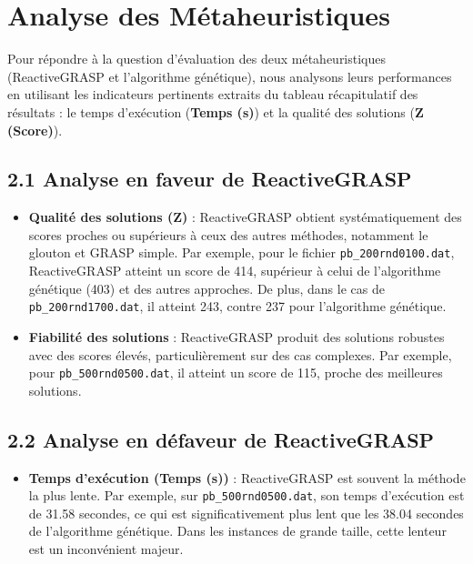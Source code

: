 \begin{minipage}
\section*{Analyse des Métaheuristiques}

Pour répondre à la question d’évaluation des deux métaheuristiques (ReactiveGRASP et l’algorithme génétique), nous analysons leurs performances en utilisant les indicateurs pertinents extraits du tableau récapitulatif des résultats : le temps d’exécution (\textbf{Temps (s)}) et la qualité des solutions (\textbf{Z (Score)}).

\subsection*{2.1 Analyse en faveur de ReactiveGRASP}

\begin{itemize}
    \item \textbf{Qualité des solutions (\textbf{Z})} : ReactiveGRASP obtient systématiquement des scores proches ou supérieurs à ceux des autres méthodes, notamment le glouton et GRASP simple. Par exemple, pour le fichier \texttt{pb\_200rnd0100.dat}, ReactiveGRASP atteint un score de 414, supérieur à celui de l’algorithme génétique (403) et des autres approches. De plus, dans le cas de \texttt{pb\_200rnd1700.dat}, il atteint 243, contre 237 pour l’algorithme génétique.
    \item \textbf{Fiabilité des solutions} : ReactiveGRASP produit des solutions robustes avec des scores élevés, particulièrement sur des cas complexes. Par exemple, pour \texttt{pb\_500rnd0500.dat}, il atteint un score de 115, proche des meilleures solutions.
\end{itemize}

\subsection*{2.2 Analyse en défaveur de ReactiveGRASP}

\begin{itemize}
    \item \textbf{Temps d’exécution (\textbf{Temps (s)})} : ReactiveGRASP est souvent la méthode la plus lente. Par exemple, sur \texttt{pb\_500rnd0500.dat}, son temps d’exécution est de 31.58 secondes, ce qui est significativement plus lent que les 38.04 secondes de l’algorithme génétique. Dans les instances de grande taille, cette lenteur est un inconvénient majeur.
\end{itemize}


\end{minipage}
